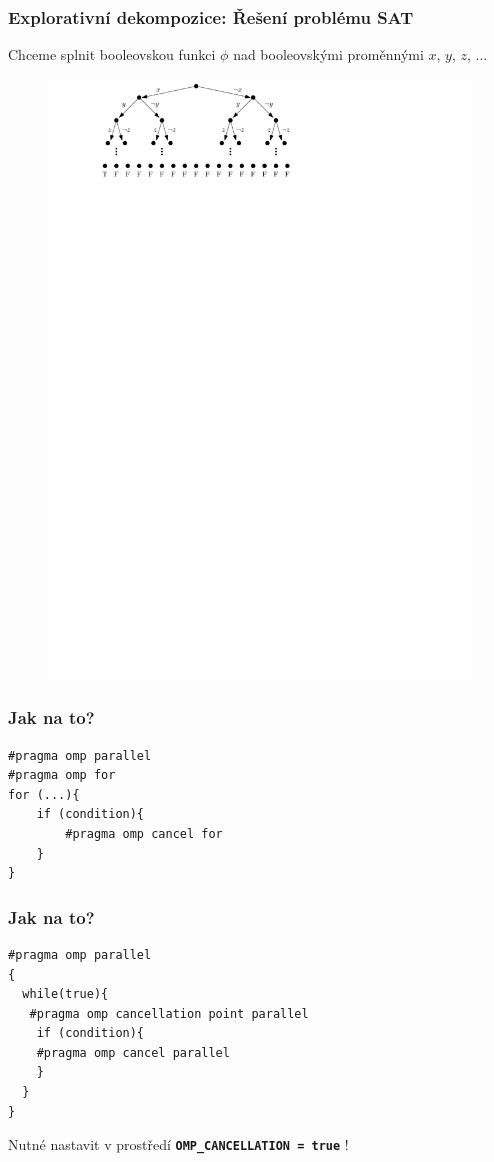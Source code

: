 \documentclass[usenames,dvipsnames,9pt]{beamer}
\begin{document}
\begin{frame}[t]
	\frametitle{Explorativní dekompozice: Řešení problému SAT}

	Chceme splnit booleovskou funkci $\phi$ nad booleovskými proměnnými $x$, $y$, $z$, ...
	\begin{figure}
		\centering\includegraphics[width=0.8\linewidth]{05/figs/sat2.pdf}
	\end{figure}
\end{frame}

{
\begin{frame}[fragile]
	\frametitle{Jak na to?}

  \begin{verbatim}
#pragma omp parallel
#pragma omp for
for (...){
    if (condition){
    	#pragma omp cancel for 
    }
}
  \end{verbatim}
\end{frame}

\begin{frame}[fragile]
	\frametitle{Jak na to?}
  \begin{verbatim}
#pragma omp parallel
{
  while(true){
   #pragma omp cancellation point parallel
    if (condition){
    #pragma omp cancel parallel
    }
  }
}
  \end{verbatim}
  
  \vspace{1em}
  {\Large \faWarning \hspace{3pt} Nutné nastavit v prostředí \texttt{\textbf{OMP\_CANCELLATION = true}} !}

  
  
\end{frame}
}
\end{document}
